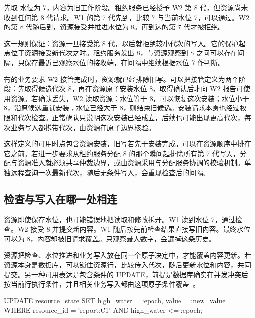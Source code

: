 先取  水位为 7，内容为旧工作阶段。租约服务已经授予 W2 第 8 代，但资源尚未收到任何第 8 代请求。W1 的第 7 代先到，比较 7 与当前水位 7，可以通过。W2 的第 8 代随后到，资源接受并推进水位为 8。再到达的第 7 代才被拒绝。


这一规则保证：资源一旦接受第 8 代，以后就拒绝较小代次的写入。它的保护起点位于资源接受新代次之时。租约服务发出 8，与资源观察到 8 之间可以存在间隔，只保存最近已观察水位的接收端，在间隔中继续根据水位 7 作判断。

有的业务要求 W2 接管完成时，资源就已经排除旧写。可以把接管定义为两个阶段：先取得候选代次 8，再在资源原子安装水位 8，取得确认后才向 W2 报告可使用资源。若确认丢失，W2 读取资源：水位等于 8，可以恢复这次安装；水位小于 8，沿原候选重试安装；水位已经大于 8，则结束旧候选。安装请求本身也经过权限和代次检查。正常确认只说明这次安装已经成立，后续也可能出现更高代次，每次业务写入都携带代次，由资源在原子边界核验。


这样定义的可用时点包含资源安装，旧写若先于安装完成，可以在资源顺序中排在它之前。若进一步要求从租约服务分配 8 的那个瞬间起排除所有第 7 代写入，分配与资源准入就必须共享仲裁边界，或由资源采用与分配服务协调的校验机制。单独远程查询一次最新代次，随后无条件写入，会重现检查后的间隔。

\subsection*{检查与写入在哪一处相连}

资源即使保存水位，也可能错误地把读取和修改拆开。W1 读到水位 7，通过检查。W2 接受 8 并提交新内容。W1 随后按先前检查结果直接写旧内容。最终水位可以为 8，内容却被旧请求覆盖。只观察最大数字，会漏掉这条历史。

资源把检查、水位推进和业务写入放在同一个原子决定中，才能覆盖内容更新。若资源本身是数据库，可以锁住资源行，比较传入代次，随后更新水位和内容，共同提交。另一种可用表达是包含条件的 UPDATE，前提是数据库确实在并发冲突后按当前行执行条件，并且相关业务写入都由这项原子条件覆盖~\cite{pg}。

\begin{BookCode}
UPDATE resource_state
SET high_water = :epoch,
    value = :new_value
WHERE resource_id = 'report:C1'
  AND high_water <= :epoch;
\end{BookCode}

